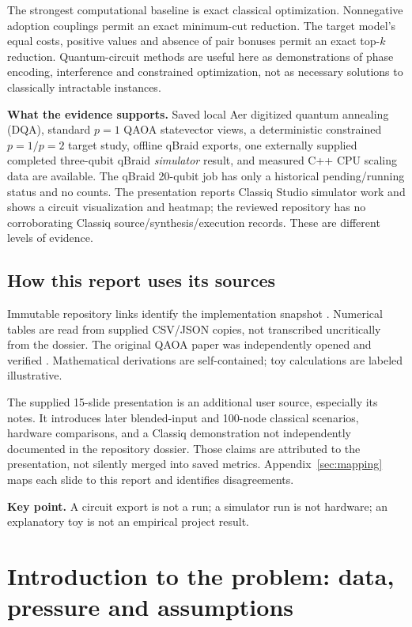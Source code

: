 \documentclass[11pt,letterpaper]{article}
\newcommand{\takeaway}[1]{\par\smallskip\textbf{Key point.} #1\par}
\begin{document}
The strongest computational baseline is exact classical optimization. Nonnegative adoption couplings permit an exact minimum-cut reduction. The target model's equal costs, positive values and absence of pair bonuses permit an exact top-$k$ reduction. Quantum-circuit methods are useful here as demonstrations of phase encoding, interference and constrained optimization, not as necessary solutions to classically intractable instances.

\textbf{What the evidence supports.} Saved local Aer digitized quantum annealing (DQA), standard $p=1$ QAOA statevector views, a deterministic constrained $p=1/p=2$ target study, offline qBraid exports, one externally supplied completed three-qubit qBraid \emph{simulator} result, and measured C++ CPU scaling data are available. The qBraid 20-qubit job has only a historical pending/running status and no counts. The presentation reports Classiq Studio simulator work and shows a circuit visualization and heatmap; the reviewed repository has no corroborating Classiq source/synthesis/execution records. These are different levels of evidence.

\subsection{How this report uses its sources}
Immutable repository links identify the implementation snapshot \cite{repo,model,exact,views,qbraid,bench,target}. Numerical tables are read from supplied CSV/JSON copies, not transcribed uncritically from the dossier. The original QAOA paper was independently opened and verified \cite{farhi2014}. Mathematical derivations are self-contained; toy calculations are labeled illustrative.

The supplied 15-slide presentation is an additional user source, especially its notes. It introduces later blended-input and 100-node classical scenarios, hardware comparisons, and a Classiq demonstration not independently documented in the repository dossier. Those claims are attributed to the presentation, not silently merged into saved metrics. Appendix~\ref{sec:mapping} maps each slide to this report and identifies disagreements.

\takeaway{A circuit export is not a run; a simulator run is not hardware; an explanatory toy is not an empirical project result.}
\section{Introduction to the problem: data, pressure and assumptions}\label{sec:problem}
\end{document}
